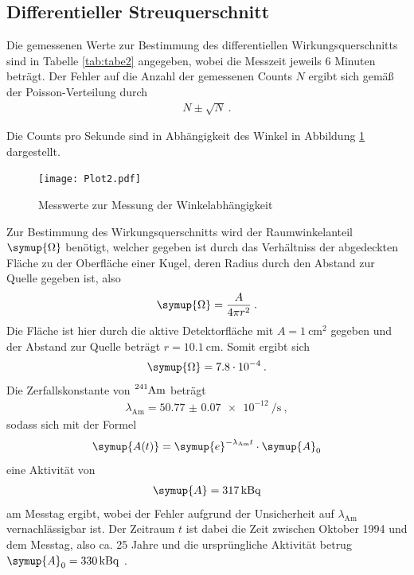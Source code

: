 \subsection{Differentieller Streuquerschnitt}
Die gemessenen Werte zur Bestimmung des differentiellen Wirkungsquerschnitts sind in
Tabelle \ref{tab:tabe2} angegeben, wobei die Messzeit jeweils 6 Minuten beträgt. Der
Fehler auf die Anzahl der gemessenen Counts $N$ ergibt sich gemäß der Poisson-Verteilung durch
\begin{align*}
  N \pm \sqrt{N} \: .
\end{align*}

Die Counts pro Sekunde sind in Abhängigkeit des Winkel in Abbildung \ref{fig:plot2}
dargestellt.
\begin{figure}
  \centering
  \texttt{[image: Plot2.pdf]}
  \caption{Messwerte zur Messung der Winkelabhängigkeit}
  \label{fig:plot2}
\end{figure}
Zur Bestimmung des Wirkungsquerschnitts wird der Raumwinkelanteil $\symup{\Omega}$ benötigt,
welcher gegeben ist durch das Verhältniss der abgedeckten Fläche zu der Oberfläche einer Kugel, deren Radius
durch den Abstand zur Quelle gegeben ist, also
\begin{equation}
  \symup{\Omega}= \frac{A}{4\pi r^2} \:.
\end{equation}
Die Fläche ist hier durch die aktive Detektorfläche mit ${A=\SI{1}{\centi\metre\squared}}$ \cite{online5}
gegeben und der Abstand zur Quelle beträgt ${r=\SI{10.1}{\centi\metre}}$.
Somit ergibt sich
\begin{align*}
  \symup{\Omega}= 7.8\cdot10^{-4} \: .
\end{align*}
Die Zerfallskonstante von $\ce{^{241}Am}$ \cite{online3} beträgt
\begin{align*}
  \lambda_{\text{Am}}=\SI{50.77(7)e-12}{\per\second} \: ,
\end{align*}
sodass sich mit der Formel
\begin{equation}
  \symup{A(t)}=\symup{e}^{-\lambda_{\text{Am}}t}\cdot \symup{A}_0
\end{equation}
eine Aktivität von
\begin{align*}
  \symup{A}=\SI{317}{\kilo\becquerel}
\end{align*}
am Messtag ergibt, wobei der Fehler aufgrund der Unsicherheit auf $\lambda_{\text{Am}}$
vernachlässigbar ist. Der Zeitraum $t$ ist dabei die Zeit zwischen
Oktober 1994 und dem Messtag, also ca. 25 Jahre und die ursprüngliche Aktivität
betrug ${\symup{A}_0=\SI{330}{\kilo\becquerel}}$ \cite{skript}.

